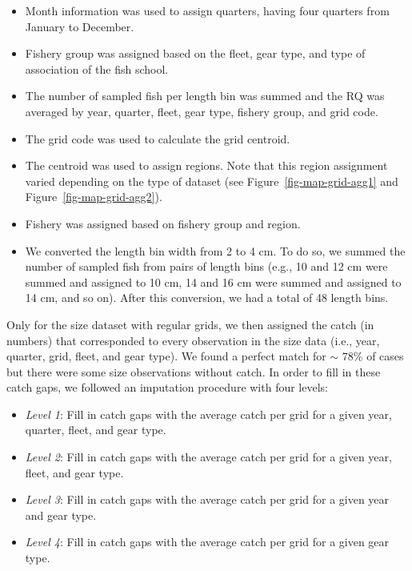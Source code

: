 \documentclass[
]{scrartcl}
\providecommand{\tightlist}{%
  \setlength{\itemsep}{0pt}\setlength{\parskip}{0pt}}\usepackage{longtable,booktabs,array}
\begin{document}
\begin{itemize}
\tightlist
\item
  Month information was used to assign quarters, having four quarters
  from January to December.
\item
  Fishery group was assigned based on the fleet, gear type, and type of
  association of the fish school.
\item
  The number of sampled fish per length bin was summed and the RQ was
  averaged by year, quarter, fleet, gear type, fishery group, and grid
  code.
\item
  The grid code was used to calculate the grid centroid.
\item
  The centroid was used to assign regions. Note that this region
  assignment varied depending on the type of dataset (see
  Figure~\ref{fig-map-grid-agg1} and Figure~\ref{fig-map-grid-agg2}).
\item
  Fishery was assigned based on fishery group and region.
\item
  We converted the length bin width from 2 to 4 cm. To do so, we summed
  the number of sampled fish from pairs of length bins (e.g., 10 and 12
  cm were summed and assigned to 10 cm, 14 and 16 cm were summed and
  assigned to 14 cm, and so on). After this conversion, we had a total
  of 48 length bins.
\end{itemize}

Only for the size dataset with regular grids, we then assigned the catch
(in numbers) that corresponded to every observation in the size data
(i.e., year, quarter, grid, fleet, and gear type). We found a perfect
match for \(\sim\) 78\% of cases but there were some size observations
without catch. In order to fill in these catch gaps, we followed an
imputation procedure with four levels:

\begin{itemize}
\tightlist
\item
  \emph{Level 1}: Fill in catch gaps with the average catch per grid for
  a given year, quarter, fleet, and gear type.
\item
  \emph{Level 2}: Fill in catch gaps with the average catch per grid for
  a given year, fleet, and gear type.
\item
  \emph{Level 3}: Fill in catch gaps with the average catch per grid for
  a given year and gear type.
\item
  \emph{Level 4}: Fill in catch gaps with the average catch per grid for
  a given gear type.
\end{itemize}
\end{document}
